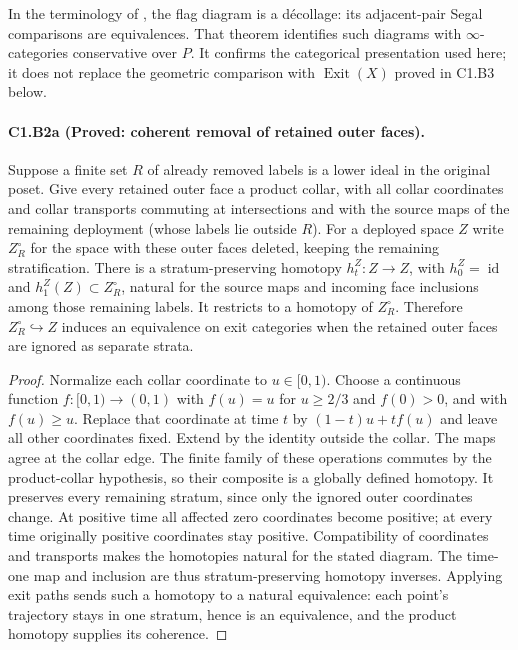 In the terminology of \cite[Definition 1.1.4 and Theorem 1.1.7]{B56Haine2023},
the flag diagram is a d\'ecollage: its adjacent-pair Segal comparisons
are equivalences. That theorem identifies such diagrams with
$\infty$-categories conservative over $P$. It confirms the categorical
presentation used here; it does not replace the geometric comparison
with $\operatorname{Exit}(X)$ proved in C1.B3 below.

\paragraph{C1.B2a (Proved: coherent removal of retained outer faces).}
Suppose a finite set $R$ of already removed labels is a lower ideal
in the original poset. Give every retained outer face a product
collar, with all collar coordinates and collar transports commuting
at intersections and with the source maps of the remaining deployment
(whose labels lie outside $R$).
For a deployed space $Z$ write $Z^\circ_R$ for the space with these
outer faces deleted, keeping the remaining stratification.
There is a stratum-preserving homotopy $h^Z_t:Z\to Z$, with
$h^Z_0=\operatorname{id}$ and $h^Z_1(Z)\subset Z^\circ_R$, natural
for the source maps and incoming face inclusions among those remaining
labels. It restricts to a
homotopy of $Z^\circ_R$. Therefore
$Z^\circ_R\hookrightarrow Z$ induces an equivalence on exit categories
when the retained outer faces are ignored as separate strata.

\begin{proof}
Normalize each collar coordinate to $u\in[0,1)$. Choose a continuous
function $f:[0,1)\to(0,1)$ with $f(u)=u$ for $u\geq2/3$ and
$f(0)>0$, and with $f(u)\geq u$. Replace that coordinate at time $t$
by $(1-t)u+tf(u)$ and leave all other coordinates fixed. Extend by
the identity outside the collar. The maps agree at the collar edge.
The finite family of these operations commutes by the product-collar
hypothesis, so their composite is a globally defined homotopy.
It preserves every remaining stratum, since only the ignored outer
coordinates change. At positive time all affected zero coordinates
become positive; at every time originally positive coordinates stay
positive. Compatibility of coordinates and transports makes the
homotopies natural for the stated diagram. The time-one map and
inclusion are thus stratum-preserving homotopy inverses. Applying
exit paths sends such a homotopy to a natural equivalence: each
point's trajectory stays in one stratum, hence is an equivalence,
and the product homotopy supplies its coherence.
\end{proof}

